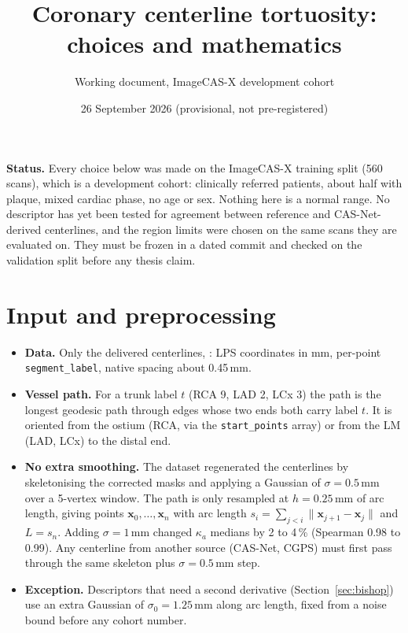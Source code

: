 \documentclass[11pt,a4paper]{article}
\title{Coronary centerline tortuosity: choices and mathematics}
\author{Working document, ImageCAS-X development cohort}
\date{26 September 2026 (provisional, not pre-registered)}
\newcommand{\ka}{\kappa_a}
\begin{document}
\maketitle

\noindent\textbf{Status.} Every choice below was made on the ImageCAS-X training split (560 scans), which is a
development cohort: clinically referred patients, about half with plaque, mixed cardiac phase, no age or sex.
Nothing here is a normal range. No descriptor has yet been tested for agreement between reference and
CAS-Net-derived centerlines, and the region limits were chosen on the same scans they are evaluated on.
They must be frozen in a dated commit and checked on the validation split before any thesis claim.

\section{Input and preprocessing}

\begin{itemize}
\item \textbf{Data.} Only the delivered centerlines,
  : LPS coordinates in mm, per-point
  \texttt{segment\_label}, native spacing about 0.45\,mm.
\item \textbf{Vessel path.} For a trunk label $t$ (RCA 9, LAD 2, LCx 3) the path is the longest geodesic
  path through edges whose two ends both carry label $t$. It is oriented from the ostium (RCA, via the
  \texttt{start\_points} array) or from the LM (LAD, LCx) to the distal end.
\item \textbf{No extra smoothing.} The dataset regenerated the centerlines by skeletonising the corrected
  masks and applying a Gaussian of $\sigma=0.5$\,mm over a 5-vertex window. The path is only resampled at
  $h=0.25$\,mm of arc length, giving points $\mathbf{x}_0,\dots,\mathbf{x}_n$ with arc length
  $s_i = \sum_{j<i}\lVert\mathbf{x}_{j+1}-\mathbf{x}_j\rVert$ and $L=s_n$. Adding $\sigma=1$\,mm changed
  $\ka$ medians by 2 to 4\,\% (Spearman 0.98 to 0.99). Any centerline from another source (CAS-Net,
  CGPS) must first pass through the same skeleton plus $\sigma=0.5$\,mm step.
\item \textbf{Exception.} Descriptors that need a second derivative (Section~\ref{sec:bishop}) use an extra
  Gaussian of $\sigma_0 = 1.25$\,mm along arc length, fixed from a noise bound before any cohort number.
\end{itemize}
\end{document}
